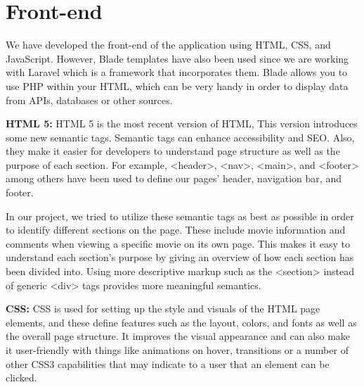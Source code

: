 \section{Front-end}


We have developed the front-end of the application using HTML, CSS, and JavaScript.
However, Blade templates have also been used since we are working with Laravel which is a framework that incorporates them.
Blade allows you to use PHP within your HTML, which can be very handy in order to display data from APIs, databases or other sources.\newline

\textbf{HTML 5:} \newline
HTML 5 is the most recent version of HTML, This version introduces some new semantic tags.
Semantic tags can enhance accessibility and SEO.
Also, they make it easier for developers to understand page structure as well as the purpose of each section.
For example, \textless{}header\textgreater{}, \textless{}nav\textgreater{}, \textless{}main\textgreater{}, and \textless{}footer\textgreater{} among others have been used to define our pages’ header, navigation bar, and footer.\newline

In our project, we tried to utilize these semantic tags as best as possible in order to identify different sections on the page.
These include movie information and comments when viewing a specific movie on its own page.
This makes it easy to understand each section’s purpose by giving an overview of how each section has been divided into.
Using more descriptive markup such as the \textless{}section\textgreater{} instead of generic \textless{}div\textgreater{} tags provides more meaningful semantics.\newline

\textbf{CSS:} \newline
CSS is used for setting up the style and visuals of the HTML page elements,
and these define features such as the layout, colors, and fonts as well as the overall page structure.
It improves the visual appearance and can also make it user-friendly with things like animations on hover, transitions or a number of other CSS3 capabilities that may indicate to a user that an element can be clicked.\newline

